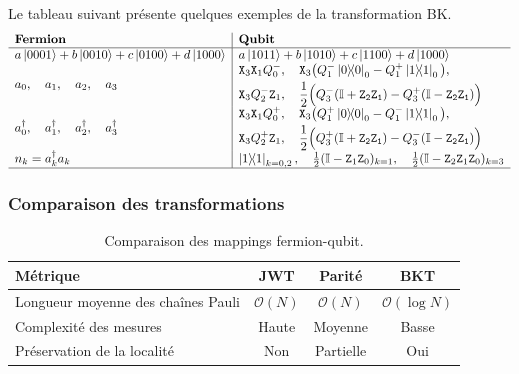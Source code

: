 \documentclass[12pt,a4paper,svgnames,x11names,rgb,table]{article} %
\numberwithin{equation}{section} %
\numberwithin{figure}{section} %
\numberwithin{table}{section} %
\begin{document}
Le tableau suivant présente quelques exemples de la transformation BK.
$$
\begin{array}{l|l}
\textbf{Fermion} & \textbf{Qubit} \\ \hline
a\ket{0001}+b\ket{0010}+c\ket{0100}+d\ket{1000} & a\ket{1011}+b\ket{1010}+c\ket{1100}+d\ket{1000}  \\
a_0 ,\quad a_1 ,\quad a_2 ,\quad a_3 &
\begin{aligned}
&\mathtt{X}_3\mathtt{X}_1Q^-_0 ,\quad \mathtt{X}_3\big( Q^-_1\op{0}_0 - Q^+_1\op{1}_0 \big) ,\\ &\mathtt{X}_3Q^-_2\mathtt{Z}_1 ,\quad 
\frac12\Big(Q^-_3(\mathbb{I} + \mathtt{Z_2Z_1}) -  Q^+_3(\mathbb{I} - \mathtt{Z_2Z_1})\Big)
\end{aligned} \\
a^\dagger_0 ,\quad a^\dagger_1 ,\quad a^\dagger_2 ,\quad a^\dagger_3 &
\begin{aligned}
&\mathtt{X}_3\mathtt{X}_1Q^+_0 ,\quad \mathtt{X}_3\big( Q^+_1\op{0}_0 - Q^-_1\op{1}_0 \big) ,\\ &\mathtt{X}_3Q^+_2\mathtt{Z}_1 ,\quad 
\frac12\Big(Q^+_3(\mathbb{I} + \mathtt{Z_2Z_1}) -  Q^-_3(\mathbb{I} - \mathtt{Z_2Z_1})\Big)
\end{aligned} \\
n_k = a^\dagger_k a_k & \op{1}_{k=0,2} ,\quad  \frac12(\mathbb{I} - \mathtt{Z}_1\mathtt{Z}_{0})_{k=1},
\quad  \frac12(\mathbb{I} - \mathtt{Z}_2\mathtt{Z}_1\mathtt{Z}_{0})_{k=3}
\\\hline
\end{array}
$$

\subsubsection{Comparaison des transformations}

\begin{table}[h!]
    \centering
    \caption{Comparaison des mappings fermion-qubit.}
    \begin{tabular}{l |c| c| c}
        \toprule
        \textbf{Métrique} & JWT & Parité & BKT \\
        \midrule
        Longueur moyenne des chaînes Pauli & $\mathcal{O}(N)$ & $\mathcal{O}(N)$ & $\mathcal{O}(\log N)$ \\
        Complexité des mesures & Haute & Moyenne & Basse \\
        Préservation de la localité & Non & Partielle & Oui \\
        \bottomrule
    \end{tabular}
    \label{tab:mapping_comparison}
\end{table}
\end{document}
